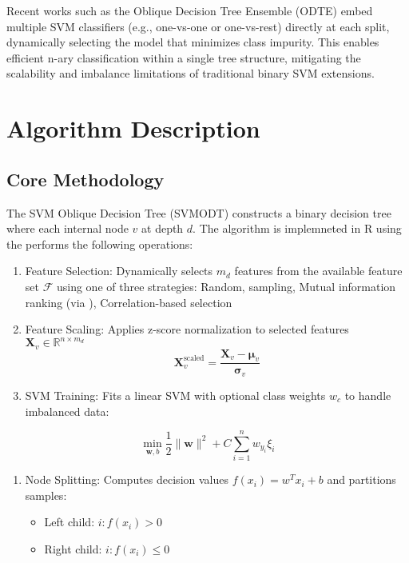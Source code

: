 Recent works such as the Oblique Decision Tree Ensemble (ODTE) \citep{montanana2025} embed multiple SVM classifiers (e.g., one-vs-one or one-vs-rest) directly at each split, dynamically selecting the model that minimizes class impurity. This enables efficient n-ary classification within a single tree structure, mitigating the scalability and imbalance limitations of traditional binary SVM extensions.

\section{Algorithm Description}\label{algorithm-description}

\subsection{Core Methodology}\label{core-methodology}

The SVM Oblique Decision Tree (SVMODT) constructs a binary decision tree where each internal node \(v\) at depth \(d\). The algorithm is implemneted in R using the  performs the following operations:

\begin{enumerate}
\def\labelenumi{\arabic{enumi}.}
\item
  Feature Selection: Dynamically selects \(m_d\) features from the available feature set \(\mathcal{F}\) using one of three strategies: Random, sampling, Mutual information ranking (via ), Correlation-based selection
\item
  Feature Scaling: Applies z-score normalization to selected features \(\mathbf{X}_v \in \mathbb{R}^{n \times m_d}\) \[\mathbf{X}_v^{\text{scaled}} = \frac{\mathbf{X}_v - \boldsymbol{\mu}_v}{\boldsymbol{\sigma}_v}\]
\item
  SVM Training: Fits a linear SVM with optional class weights \(w_c\) to handle imbalanced data:
\end{enumerate}

\[\min_{\mathbf{w}, b} \frac{1}{2}\|\mathbf{w}\|^2 + C\sum_{i=1}^{n} w_{y_i}\xi_i\]

\begin{enumerate}
\def\labelenumi{\arabic{enumi}.}
\setcounter{enumi}{3}
\item
  Node Splitting: Computes decision values \(f(x_i) = w^Tx_i+b\) and partitions samples:

  \begin{itemize}
  \item
    Left child: \({i:f(x_i)>0}\)
  \item
    Right child: \({i:f(x_i)\leq0}\)
  \end{itemize}
\end{enumerate}

